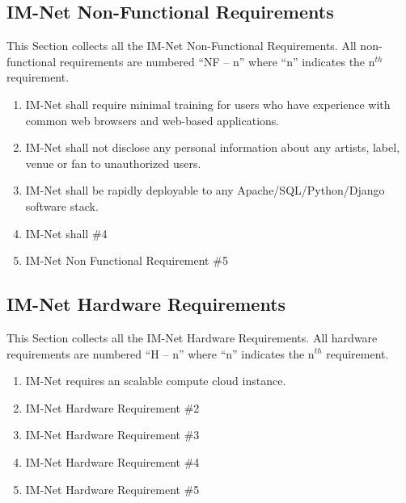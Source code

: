 \documentclass[letterpaper]{article}
\begin{document}
\subsection{IM-Net Non-Functional Requirements}

This Section collects all the IM-Net Non-Functional Requirements. All non-functional requirements are numbered ``NF -- n'' where ``n'' indicates the n${}^{th}$ requirement.

\begin{enumerate}
\item  IM-Net shall require minimal training for users who have experience with common web browsers and web-based applications.

\item  IM-Net shall not disclose any personal information about any artists, label, venue or fan to unauthorized users.

\item  IM-Net shall be rapidly deployable to any Apache/SQL/Python/Django software stack.

\item  IM-Net shall  \#4

\item  IM-Net Non Functional Requirement \#5
\end{enumerate}

\subsection{IM-Net Hardware Requirements}

This Section collects all the IM-Net Hardware Requirements. All hardware requirements are numbered ``H -- n'' where ``n'' indicates the n${}^{th}$ requirement.

\begin{enumerate}
\item  IM-Net requires an scalable compute cloud instance.

\item  IM-Net Hardware Requirement \#2

\item  IM-Net Hardware Requirement \#3

\item  IM-Net Hardware Requirement \#4

\item  IM-Net Hardware Requirement \#5
\end{enumerate}

\eject
\end{document}
